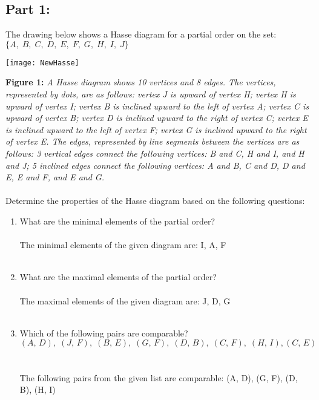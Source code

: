 \documentclass{amsart}
\theoremstyle{definition}
\theoremstyle{Exercise}
\theoremstyle{remark}
\theoremstyle{rule}
\numberwithin{equation}{section}
\begin{document}
 \subsection*{Part 1:}
 The drawing below shows a Hasse diagram for a partial order on the set:
 \\
   $\{A, \;B,\; C,\; D,\; E,\; F,\; G,\; H,\; I, \; J\}$
 \begin{center}
 \texttt{[image: NewHasse]}
 \end{center}
 {\color{blue} {\bf Figure 1:} \emph{A Hasse diagram shows 10 vertices and 8 edges. The vertices, represented by dots, are as follows:  vertex J is upward of vertex H; vertex H is upward of vertex I; vertex B is inclined upward to the left of vertex A; vertex C is upward of vertex B; vertex D is inclined upward to the right of vertex C; vertex E is inclined upward to the left of vertex F; vertex G is inclined upward to the right of vertex E. The edges, represented by line segments between the vertices are as follows: 3 vertical edges connect the following vertices: B and C, H and I, and H and J; 5 inclined edges connect the following vertices: A and B, C and D, D and E, E and F, and E and G. 
  }
  }
  \\\\
 Determine the properties of the Hasse diagram based on the following questions:

  \begin{enumerate}[label=(\alph*)]
    \item What are the minimal elements of the partial order?
\\\\
  The minimal elements of the given diagram are: I, A, F
\\\\
    \item What are the maximal elements of the partial order?
\\\\
  The maximal elements of the given diagram are: J, D, G
\\\\
    \item Which of the following pairs are comparable?
\[(A,\, D),\; (J,\, F),\; (B,\, E),\; (G,\, F),\; (D,\, B),\; (C,\, F),\; (H,\, I), (C,\, E)\]
\\\\
  The following pairs from the given list are comparable: (A, D), (G, F), (D, B), (H, I)
\\\\
   \end{enumerate}
   \newpage
~\\
\end{document}
